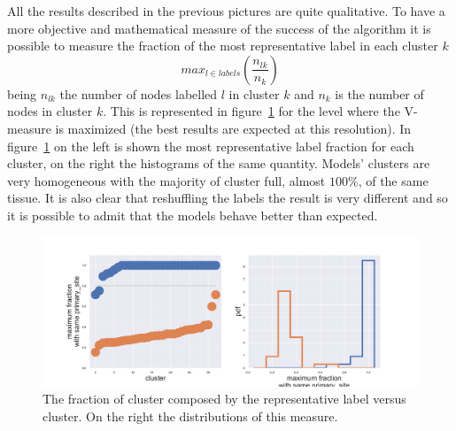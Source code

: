All the results described in the previous pictures are quite qualitative. To have a more objective and mathematical measure of the success of the algorithm it is possible to measure the fraction of the most representative label in each cluster $k$
\[
max_{l\in labels}\left(\frac{n_{l k}}{n_k}\right)
\]
being $n_{l k}$ the number of nodes labelled $l$ in cluster $k$ and $n_k$ is the number of nodes in cluster $k$. This is represented in figure~\ref{fig:gtex/oversigma_10tissue/shuffledcluster_maximum_l2_primary_site} for the level where the V-measure is maximized (the best results are expected at this resolution). In figure~\ref{fig:gtex/oversigma_10tissue/shuffledcluster_maximum_l2_primary_site} on the left is shown the most representative label fraction for each cluster, on the right the histograms of the same quantity. Models' clusters are very homogeneous with the majority of cluster full, almost $100\%$, of the same tissue. It is also clear that reshuffling the labels the result is very different and so it is possible to admit that the models behave better than expected. 
\begin{figure}[htb!]
    \centering
    \includegraphics[width=0.85\linewidth]{pictures/topic/gtex/oversigma_10tissue/shuffledcluster_maximum_l2_primary_site.pdf}
    \caption{The fraction of cluster composed by the representative label versus cluster. On the right the distributions of this measure.}
    \label{fig:gtex/oversigma_10tissue/shuffledcluster_maximum_l2_primary_site}
\end{figure}

